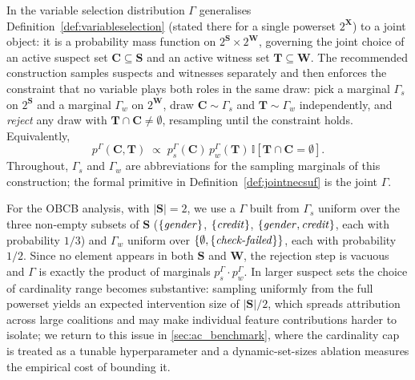 In \ourapproach the variable selection distribution $\Gamma$ generalises
Definition~\ref{def:variableselection} (stated there for a single powerset
$2^{\mathbf{X}}$) to a joint object: it is a probability
mass function on $2^{\mathbf{S}} \times 2^{\mathbf{W}}$, governing the joint
choice of an active suspect set $\mathbf{C} \subseteq \mathbf{S}$ and an active
witness set $\mathbf{T} \subseteq \mathbf{W}$. The recommended construction
samples suspects and witnesses separately and then enforces the constraint
that no variable plays both roles in the same draw: pick a marginal $\Gamma_s$
on $2^{\mathbf{S}}$ and a marginal $\Gamma_w$ on $2^{\mathbf{W}}$, draw
$\mathbf{C}\sim\Gamma_s$ and $\mathbf{T}\sim\Gamma_w$ independently, and
\emph{reject} any draw with $\mathbf{T}\cap\mathbf{C}\neq\emptyset$,
resampling until the constraint holds. Equivalently,
\[
p^\Gamma(\mathbf{C}, \mathbf{T}) \;\propto\;
p_s^\Gamma(\mathbf{C})\,p_w^\Gamma(\mathbf{T})\,
\mathbb{I}[\mathbf{T}\cap\mathbf{C}=\emptyset].
\]
 Throughout, $\Gamma_s$ and $\Gamma_w$ are
abbreviations for the sampling marginals of this construction; the formal
primitive in Definition~\ref{def:jointnecsuf} is the joint $\Gamma$.

For the OBCB analysis, with $|\mathbf{S}|=2$, we use a $\Gamma$ built from
$\Gamma_s$ uniform over the three non-empty subsets of $\mathbf{S}$
($\{\varname{gender}\}$, $\{\varname{credit}\}$,
$\{\varname{gender}, \varname{credit}\}$, each with probability $1/3$) and
$\Gamma_w$ uniform over $\{\emptyset, \{\varname{check\text{-}failed}\}\}$,
each with probability $1/2$. Since no element appears in both $\mathbf{S}$
and $\mathbf{W}$, the rejection step is vacuous and $\Gamma$ is exactly the product of marginals $p_s^\Gamma\cdot p_w^\Gamma$. In larger suspect sets the choice of cardinality
range becomes substantive: sampling uniformly from the full powerset yields an
expected intervention size of $|\mathbf{S}|/2$, which spreads attribution
across large coalitions and may make individual feature contributions harder
to isolate; we return to this issue in \cref{sec:ac_benchmark}, where
the cardinality cap is treated as a tunable hyperparameter and a
dynamic-set-sizes ablation measures the empirical cost of bounding it.

